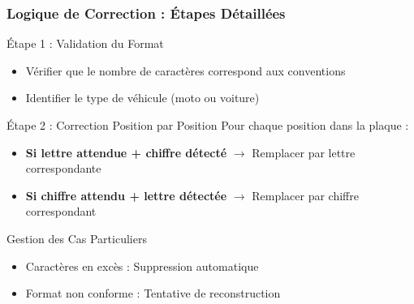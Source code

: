 \documentclass[
	11pt,
	aspectratio=169,
]{beamer}
\begin{document}
\begin{frame}
	\frametitle{Logique de Correction : Étapes Détaillées}
	
	\begin{block}{Étape 1 : Validation du Format}
		\begin{itemize}
			\item Vérifier que le nombre de caractères correspond aux conventions
			\item Identifier le type de véhicule (moto ou voiture)
		\end{itemize}
	\end{block}
	
	\smallskip
	
	\begin{block}{Étape 2 : Correction Position par Position}
		Pour chaque position dans la plaque :
		\begin{itemize}
			\item \textbf{Si lettre attendue + chiffre détecté} $\rightarrow$ Remplacer par lettre correspondante
			\item \textbf{Si chiffre attendu + lettre détectée} $\rightarrow$ Remplacer par chiffre correspondant
		\end{itemize}
	\end{block}
	
	\smallskip
	
	\begin{alertblock}{Gestion des Cas Particuliers}
		\begin{itemize}
			\item Caractères en excès : Suppression automatique
			\item Format non conforme : Tentative de reconstruction
		\end{itemize}
	\end{alertblock}
\end{frame}

\end{document}
